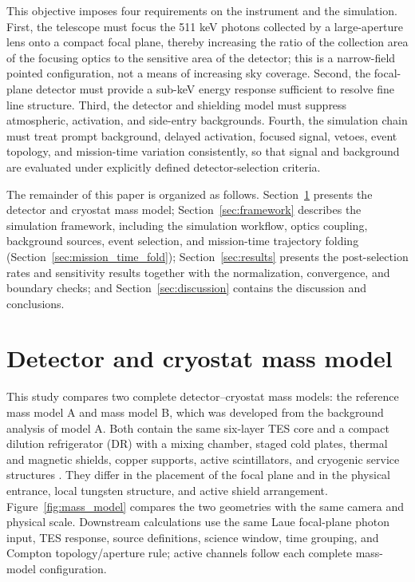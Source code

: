 \documentclass[11pt]{article}
\begin{document}
This objective imposes four requirements on the instrument and the simulation.
First, the telescope must focus the 511 keV photons collected by a large-aperture
lens onto a compact focal plane, thereby increasing the ratio of the collection
area of the focusing optics to the sensitive area of the detector; this is a
narrow-field pointed configuration, not a means of increasing sky coverage.
Second, the focal-plane detector must provide a sub-keV energy response
sufficient to resolve fine line structure. Third, the detector and shielding
model must suppress atmospheric, activation, and side-entry backgrounds.
Fourth, the simulation chain must treat prompt background, delayed activation,
focused signal, vetoes, event topology, and mission-time variation consistently,
so that signal and background are evaluated under explicitly defined
detector-selection criteria.

The remainder of this paper is organized as follows. Section~\ref{sec:geometry}
presents the detector and cryostat mass model; Section~\ref{sec:framework}
describes the simulation framework, including the simulation workflow, optics
coupling, background sources, event selection, and mission-time trajectory
folding (Section~\ref{sec:mission_time_fold}); Section~\ref{sec:results} presents
the post-selection rates and sensitivity results together with the
normalization, convergence, and boundary checks; and
Section~\ref{sec:discussion} contains the discussion and conclusions.

\endgroup

\section{Detector and cryostat mass model}
\label{sec:geometry}

This study compares two complete detector--cryostat mass models: the reference
mass model A and mass model B, which was developed from the background analysis
of model A. Both contain the same six-layer TES core and a compact dilution
refrigerator (DR) with a mixing chamber, staged cold plates, thermal and magnetic
shields, copper supports, active scintillators, and cryogenic service structures
\cite{Shirazi2023,Gottardi2021TESReview}. They differ in the placement of the
focal plane and in the physical entrance, local tungsten structure, and active
shield arrangement. Figure~\ref{fig:mass_model} compares the two geometries with
the same camera and physical scale. Downstream calculations use the same Laue
focal-plane photon input, TES response, source definitions, science window,
time grouping, and Compton topology/aperture rule; active channels follow each
complete mass-model configuration.
\end{document}
